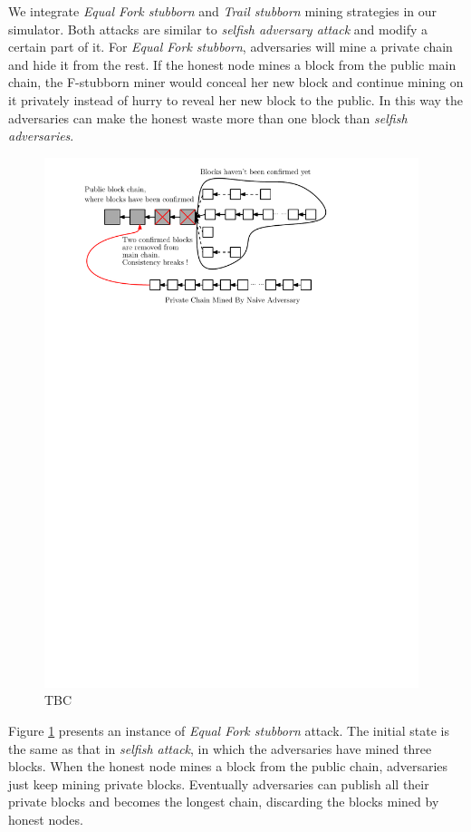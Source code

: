 \documentclass{llncs}
\begin{document}
We integrate \emph{Equal Fork stubborn} and \emph{Trail stubborn} mining strategies in our simulator. Both attacks are similar to \emph{selfish adversary attack} and modify a certain part of it. For \emph{Equal Fork stubborn}, adversaries will mine a private chain and hide it from the rest. If the honest node mines a block from the public main chain, the F-stubborn miner would conceal her new block and continue mining on it privately instead of hurry to reveal her new block to the public. In this way the adversaries can make the honest waste more than one block than \emph{selfish adversaries}.
\vspace{-4mm}
\begin{figure}
\centering
\includegraphics[width=4.3in]{Figures/Naive-Attack.pdf}
\vspace{-3mm}
\caption{TBC}
\label{equal}
\end{figure}

Figure \ref{equal} presents an instance of \emph{Equal Fork stubborn} attack. The initial state is the same as that in \emph{selfish attack}, in which the adversaries have mined three blocks. When the honest node mines a block from the public chain, adversaries just keep mining private blocks. Eventually adversaries can publish all their private blocks and becomes the longest chain, discarding the blocks mined by honest nodes.
\end{document}
